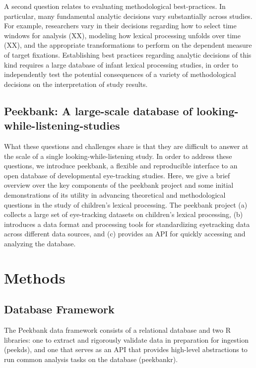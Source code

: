 \documentclass[10pt, letterpaper]{article}
\begin{document}
A second question relates to evaluating methodological best-practices.
In particular, many fundamental analytic decisions vary substantially
across studies. For example, researchers vary in their decisions
regarding how to select time windows for analysis (XX), modeling how
lexical processing unfolds over time (XX), and the appropriate
transformations to perform on the dependent measure of target fixations.
Establishing best practices regarding analytic decisions of this kind
requires a large database of infant lexical processing studies, in order
to independently test the potential consequences of a variety of
methodological decisions on the interpretation of study results.

\hypertarget{peekbank-a-large-scale-database-of-looking-while-listening-studies}{%
\subsection{Peekbank: A large-scale database of
looking-while-listening-studies}\label{peekbank-a-large-scale-database-of-looking-while-listening-studies}}

What these questions and challenges share is that they are difficult to
answer at the scale of a single looking-while-listening study. In order
to address these questions, we introduce peekbank, a flexible and
reproducible interface to an open database of developmental eye-tracking
studies. Here, we give a brief overview over the key components of the
peekbank project and some initial demonstrations of its utility in
advancing theoretical and methodological questions in the study of
children's lexical processing. The peekbank project (a) collects a large
set of eye-tracking datasets on children's lexical processing, (b)
introduces a data format and processing tools for standardizing
eyetracking data across different data sources, and (c) provides an API
for quickly accessing and analyzing the database.

\hypertarget{methods}{%
\section{Methods}\label{methods}}

\hypertarget{database-framework}{%
\subsection{Database Framework}\label{database-framework}}

The Peekbank data framework consists of a relational database and two R
libraries: one to extract and rigorously validate data in preparation
for ingestion (peekds), and one that serves as an API that provides
high-level abstractions to run common analysis tasks on the database
(peekbankr).
\end{document}
